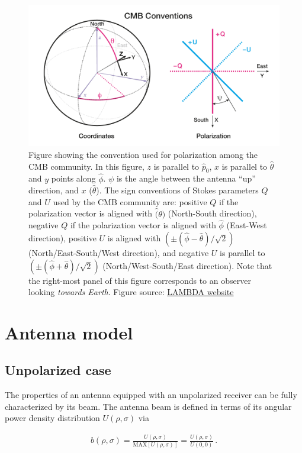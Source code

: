 \documentclass[a4paper,11pt]{article}
\begin{document}
\begin{figure}
	\centering
	\includegraphics[width=0.7\linewidth]{figures/cmb_coord_convention}
	\caption{Figure showing the convention used for polarization among the CMB community. In this figure, $z$ is parallel to $\hat{p}_0$, $x$ is parallel to $\hat{\theta}$ and $y$ points along $\hat{\phi}$. $\psi$ is the angle between the antenna ``up'' direction, and $x$ ($\hat{\theta}$). The sign conventions of Stokes parameters $Q$ and $U$ used by the CMB community are: positive $Q$ if the polarization vector is aligned with $\hat(\theta)$ (North-South direction), negative $Q$ if the polarization vector is aligned with $\hat{\phi}$ (East-West direction), positive $U$ is aligned with $(\pm(\hat{\phi} - \hat{\theta})/\sqrt{2} )$ (North/East-South/West direction), and negative $U$ is parallel to $(\pm(\hat{\phi} + \hat{\theta})/\sqrt{2} )$ (North/West-South/East direction). Note that the right-most panel of this figure corresponds to an observer looking \textsl{towards Earth}. Figure source: \href{https://lambda.gsfc.nasa.gov/product/about/pol_convention.cfm}{LAMBDA website}}
	\label{fig::cmbcoordconvention}
\end{figure}

\section{Antenna model}
\label{sec::antennas}

\subsection{Unpolarized case}

The properties of an antenna equipped with an unpolarized receiver can be fully characterized by its beam. The antenna beam is defined in terms of its angular power density distribution $U(\rho,\sigma)$ via

\begin{equation}
\begin{aligned}
b(\rho, \sigma) = \frac{ U(\rho, \sigma) }{ \mathrm{MAX}\left[ U(\rho,\sigma) \right] }  =  \frac{ U(\rho, \sigma) }{ U(0,0) } \, .
\end{aligned}
\label{eq::beam_def}
\end{equation}
\end{document}
